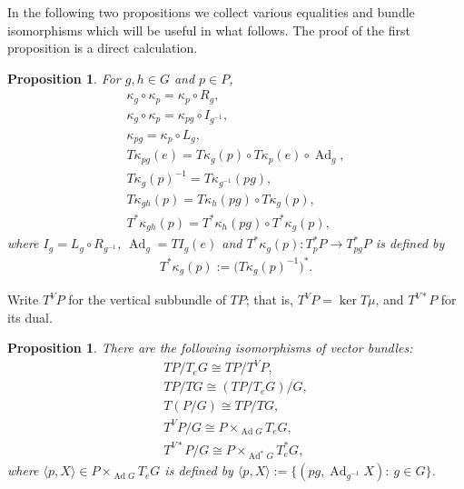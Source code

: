 \documentclass[pdftex]{sigma}
\renewcommand{\to}{\rightarrow}
\DeclareMathOperator{\Ad}{Ad}
\numberwithin{equation}{section}
\newtheorem{Proposition}[Theorem]{Proposition}
 { \theoremstyle{definition}
\newtheorem{Definition}[Theorem]{Definition}
\newtheorem{Example}[Theorem]{Example}
\newtheorem{Remark}[Theorem]{Remark} }
\begin{document}
In the following two propositions we collect various equalities and bundle isomorphisms which will be useful in what follows. The proof of the f\/irst proposition is a direct calculation.
\begin{Proposition}
For $g,h\in G$ and $p\in P$,
\begin{gather*}
\kappa_g\circ\kappa_p=\kappa_p\circ R_g,\\
\kappa_g\circ \kappa_p=\kappa_{pg}\circ I_{g^{-1}},\\
\kappa_{pg}=\kappa_p\circ L_g,\\
T\kappa_{pg}(e)=T\kappa_g(p)\circ T\kappa_p(e) \circ \Ad_g,\\
T\kappa_g(p)^{-1}=T\kappa_{g^{-1}}(pg),\\
T\kappa_{gh}(p)=T\kappa_h(pg)\circ T\kappa_g(p),\\
T^*\kappa_{gh}(p)=T^*\kappa_h(pg)\circ T^*\kappa_g(p),
\end{gather*}
where $I_g=L_g\circ R_{g^{-1}}$, $\Ad_g=TI_g(e)$ and $T^*\kappa_g(p)\colon T^*_pP\to T^*_{pg}P$ is defined by
\begin{gather*}%
T^*\kappa_g(p):=\big(T\kappa_g(p)^{-1}\big)^*.
\end{gather*}
\end{Proposition}

Write $T^VP$ for the vertical subbundle of $TP$; that is, $T^VP = \ker T\mu$, and $T^{V*}P$ for its dual.

\begin{Proposition}There are the following isomorphisms of vector bundles:
\begin{subequations}
\begin{gather}
\label{v1} TP/T_eG\cong TP/T^VP,\\
\label{v2} TP/TG\cong (TP/T_eG)/G,\\
\label{v3} T(P/G)\cong TP/TG,\\
\label{v4} T^VP/G\cong P\times_{\Ad G}T_eG,\\
\label{v5} T^{V*}P/G\cong P \times _{\Ad^*G}T^*_eG,
\end{gather}
\end{subequations}
where $\langle p,X\rangle\in P\times_{\Ad G}T_eG$ is defined by $\langle p,X\rangle:=\{(pg,\Ad _{g^{-1}}X)\colon \ g\in G\}$.
\end{Proposition}
\end{document}
